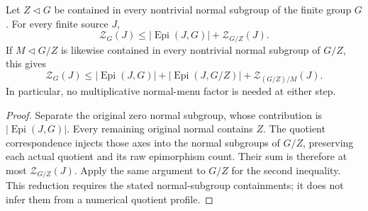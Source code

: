 \begin{samepage}
\begin{proposition}
\label{prop:monolithic-quotient-reduction}
Let $Z\lhd G$ be contained in every nontrivial normal subgroup of the
finite group $G$. For every finite source $J$,
\[
 \mathcal Z_G(J)\leq |\operatorname{Epi}(J,G)|+
                         \mathcal Z_{G/Z}(J).
\]
If $M\lhd G/Z$ is likewise contained in every nontrivial normal
subgroup of $G/Z$, this gives
\[
 \mathcal Z_G(J)\leq |\operatorname{Epi}(J,G)|+
 |\operatorname{Epi}(J,G/Z)|+\mathcal Z_{(G/Z)/M}(J).
\]
In particular, no multiplicative normal-menu factor is needed at either step.
\end{proposition}
\end{samepage}
\begin{proof}
Separate the original zero normal subgroup, whose contribution is
$|\operatorname{Epi}(J,G)|$. Every remaining original normal contains
$Z$. The quotient correspondence injects those axes into the normal
subgroups of $G/Z$, preserving each actual quotient and its raw
epimorphism count. Their sum is therefore at most
$\mathcal Z_{G/Z}(J)$. Apply the same argument to $G/Z$ for the
second inequality. This reduction requires the stated normal-subgroup
containments; it does not infer them from a numerical quotient profile.
\end{proof}

